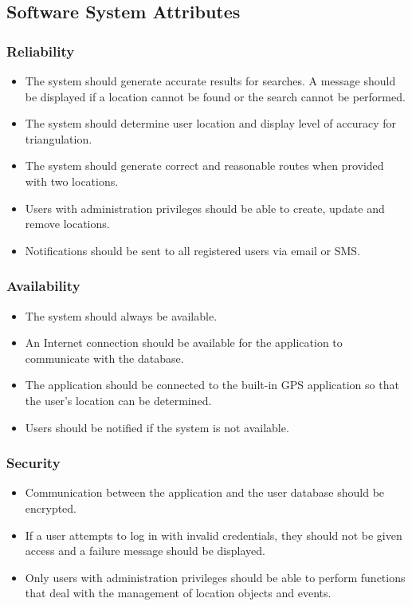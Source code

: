 \subsection{Software System Attributes}

\subsubsection{Reliability}
\begin{itemize}
    \item The system should generate accurate results for searches. A message should be displayed if a location cannot be found or the search cannot be performed.
    \item The system should determine user location and display level of accuracy for triangulation.  
    \item The system should generate correct and reasonable routes when provided with two locations.
    \item Users with administration privileges should be able to create, update and remove locations.
    \item Notifications should be sent to all registered users via email or SMS.
\end{itemize}

\subsubsection{Availability}
\begin{itemize}
    \item The system should always be available.
    \item An Internet connection should be available for the application to communicate with the database.
    \item The application should be connected to the built-in GPS application so that the user's location can be determined.
    \item Users should be notified if the system is not available.
    
\end{itemize}

\subsubsection{Security}
\begin{itemize}
    \item Communication between the application and the user database should be encrypted.
    \item If a user attempts to log in with invalid credentials, they should not be given access and a failure message should be displayed.
    \item Only users with administration privileges should be able to perform functions that deal with the management of location objects and events.
    
\end{itemize}


